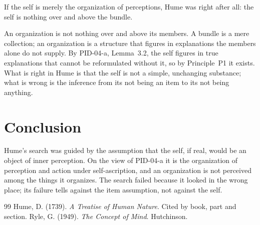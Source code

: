 \documentclass{situationist-preprint}
\begin{document}
\begin{objection}
If the self is merely the organization of perceptions, Hume was right after all: the self is nothing over and above the bundle.
\end{objection}

\begin{reply}
An organization is not nothing over and above its members. A bundle is a mere collection; an organization is a structure that figures in explanations the members alone do not supply. By PID-04-a, Lemma~3.2, the self figures in true explanations that cannot be reformulated without it, so by Principle~P1 it exists. What is right in Hume is that the self is not a simple, unchanging substance; what is wrong is the inference from its not being an item to its not being anything.
\end{reply}

\section{Conclusion}

Hume's search was guided by the assumption that the self, if real, would be an object of inner perception. On the view of PID-04-a it is the organization of perception and action under self-ascription, and an organization is not perceived among the things it organizes. The search failed because it looked in the wrong place; its failure tells against the item assumption, not against the self.

\begin{thebibliography}{99}\small
{} Hume, D. (1739). \emph{A Treatise of Human Nature}. Cited by book, part and section.
 Ryle, G. (1949). \emph{The Concept of Mind}. Hutchinson.
\end{thebibliography}
\end{document}

